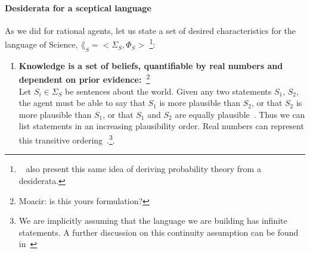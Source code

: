 \paragraph{Desiderata for a sceptical language} As we did for rational agents, let us state a set of desired characteristics for the language of Science, \(\lang_S= <\Sigma_S, \Phi_S>\)
\footnote{~ also present this same idea of deriving probability theory from a desiderata.}:
\begin{enumerate}[I.]
	\item \textbf{Knowledge is a set of beliefs, quantifiable by real numbers and dependent on prior evidence:~\cite{sowinski:2016,caticha:2008, jaynes:2003}}\footnote{Moacir: is this yours formulation?} \\
	Let \(S_i \in \Sigma_S\) be sentences about the world. Given any two statements \(S_1\), \(S_2\), the agent must be able to say that \(S_1\) is more plausible than \(S_2\), or that \(S_2\) is more plausible than \(S_1\), or that \(S_1\) and \(S_2\) are equally plausible~\cite{caticha:2008}. Thus we can list statements in an increasing plausibility order. Real numbers can represent this transitive ordering~\cite{caticha:2008}.\footnote{We are implicitly assuming that the language we are building has infinite statements. A further discussion on this continuity assumption can be found in~\cite[p. 26]{sowinski:2016}}.


\end{enumerate}
